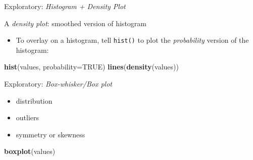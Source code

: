 \documentclass[ignorenonframetext,t]{beamer}
\newenvironment{Shaded}{\begin{snugshade}}{\end{snugshade}}
\newcommand{\KeywordTok}[1]{\textcolor[rgb]{0.13,0.29,0.53}{\textbf{#1}}}
\newcommand{\DataTypeTok}[1]{\textcolor[rgb]{0.13,0.29,0.53}{#1}}
\newcommand{\OtherTok}[1]{\textcolor[rgb]{0.56,0.35,0.01}{#1}}
\newcommand{\NormalTok}[1]{#1}
\providecommand{\tightlist}{%
  \setlength{\itemsep}{0pt}\setlength{\parskip}{0pt}}
\begin{document}
\begin{frame}[fragile]{Exploratory: \emph{Histogram + Density Plot}}

A \emph{density plot}: smoothed version of histogram

\begin{itemize}
\tightlist
\item
  To overlay on a histogram, tell \texttt{hist()} to plot the
  \emph{probability} version of the histogram:
\end{itemize}

\begin{Shaded}
\begin{Highlighting}[]
\KeywordTok{hist}\NormalTok{(values, }\DataTypeTok{probability=}\OtherTok{TRUE}\NormalTok{)}
\KeywordTok{lines}\NormalTok{(}\KeywordTok{density}\NormalTok{(values))}
\end{Highlighting}
\end{Shaded}


\end{frame}

\begin{frame}[fragile]{Exploratory: \emph{Box-whisker/Box plot}}

\begin{itemize}
\tightlist
\item
  distribution
\item
  outliers
\item
  symmetry or skewness
\end{itemize}

\begin{Shaded}
\begin{Highlighting}[]
\KeywordTok{boxplot}\NormalTok{(values)}
\end{Highlighting}
\end{Shaded}


\end{frame}
\end{document}
